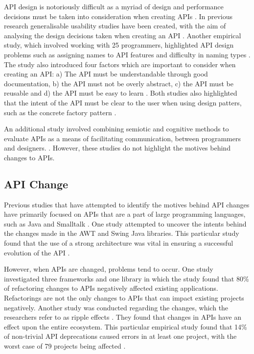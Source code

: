 \documentclass[10pt,twocolumn]{article}
\begin{document}
API design is notoriously difficult as a myriad of design and performance decisions must be taken into consideration when creating APIs \cite{bloch2008effective}\cite{afonso2012evaluating}\cite{stylos2006comparing}. In previous research generalisable usability studies have been created, with the aim of analysing the design decisions taken when creating an API \cite{stylos2006comparing}. Another empirical study, which involved working with 25 programmers, highlighted API design problems such as assigning names to API features and difficulty in naming types \cite{shi2011empirical}. The study also introduced four factors which are important to consider when creating an API: a) The API  must be understandable through good documentation, b) the API must not be overly abstract, c) the API must be reusable and d) the API must be easy to learn \cite{shi2011empirical}. Both studies also highlighted that the intent of the API must be clear to the user when using design patters, such as the concrete factory pattern \cite{shi2011empirical} \cite{stylos2006comparing}.

An additional study involved combining semiotic and cognitive methods to evaluate APIs as a means of facilitating communication, between programmers and designers. \cite{afonso2012evaluating}. However, these studies do not highlight the motives behind changes to APIs.

\subsection{API Change}
Previous studies that have attempted to identify the motives behind API changes have primarily focused on APIs that are a part of large programming languages, such as Java \cite{shi2011empirical} \cite{hou2011exploring} and Smalltalk \cite{robbes2012developers}. One study attempted to uncover the intents behind the changes made in the AWT and Swing Java libraries. This particular study found that the use of a strong architecture was vital in ensuring a successful evolution of the API \cite{hou2011exploring}.

However, when APIs are changed, problems tend to occur. One study \cite{dig2005role} investigated three frameworks and one library in which the study found that 80\% of refactoring changes to APIs negatively affected existing applications. Refactorings are not the only changes to APIs that can impact existing projects negatively. Another study was conducted regarding the changes, which the researchers refer to as ripple effects \cite{robbes2012developers}. They found that changes in APIs have an effect upon the entire ecosystem. This particular empirical study found that 14\% of non-trivial API deprecations caused errors in at least one project, with the worst case of 79 projects being affected \cite{robbes2012developers}.
\end{document}
